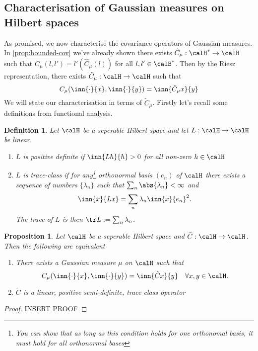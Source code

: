 \documentclass[fontsize=12pt, DIV=10]{scrreprt}
\theoremstyle{mydefn}
\newtheorem{defn}{Definition}
\newtheorem{prop}{Proposition}
\theoremstyle{remark}
\newcommand{\defeq}{:=}
\begin{document}
\subsection{Characterisation of Gaussian measures on Hilbert spaces}

As promised, we now characterise the covariance operators  of Gaussian measures. In \vref{prop:bounded-cov} we've already shown there exists $\hat{C}_{\mu}: \calH^* \to \calH$ such that $C_{\mu}(l, l') = l'(\hat{C}_{\mu}(l))$ for all $l, l' \in \calB^*$. Then by the Riesz representation, there exists $\tilde{C}_{\mu}: \calH \to \calH$ such that
\begin{equation}
	C_{\mu}(\inn{\cdot}{x}, \inn{\cdot}{y}) = \inn{\tilde{C}_{\mu}x}{y}
\end{equation}
We will state our characterisation in terms of $\tilde{C}_{\mu}$. Firstly let's recall some definitions from functional analysis.
\begin{defn}
	Let $\calH$ be a seperable Hilbert space and let $L: \calH \to \calH$ be linear.
	\begin{enumerate}
		\item $L$ is \emph{positive definite} if $\inn{L h}{h} > 0$ for all non-zero $h \in \calH$
		\item $L$ is \emph{trace-class} if for any\footnote{You can show that as long as this condition holds for one orthonomal basis, it must hold for all orthonormal bases} orthonormal basis $(e_n)$ of $\calH$ there exists a sequence of numbers $\{\lambda_n\}$ such that $\sum_n \abs{\lambda_n} < \infty$ and
			\begin{equation}
				\inn{x}{Lx} = \sum_n \lambda_n \inn{x}{e_n}^2.
			\end{equation}
			The \emph{trace} of $L$ is then $\tr L \defeq \sum_n \lambda _n$.
	\end{enumerate}
\end{defn}

\begin{prop}
	Let $\calH$ be a seperable Hilbert space and $\tilde{C}: \calH \to \calH$. Then the following are equivalent
	\begin{enumerate}
		\item There exists a Gaussian measure $\mu$ on $\calH$ such that
			\begin{equation}
				C_{\mu}(\inn{\cdot}{x}, \inn{\cdot}{y}) = \inn{\tilde{C} x}{y} \quad \forall x, y \in \calH.
			\end{equation}
		\item $\tilde{C}$ is a linear, positive semi-definite, trace class operator
	\end{enumerate}
\end{prop}
\begin{proof}
	INSERT PROOF
\end{proof}
\end{document}
